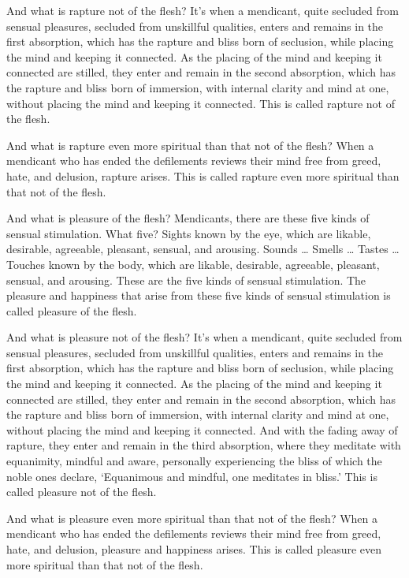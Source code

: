 \documentclass[12pt,openany]{book}%
\begin{document}
And what is rapture not of the flesh? It’s when a mendicant, quite secluded from sensual pleasures, secluded from unskillful qualities, enters and remains in the first absorption, which has the rapture and bliss born of seclusion, while placing the mind and keeping it connected. As the placing of the mind and keeping it connected are stilled, they enter and remain in the second absorption, which has the rapture and bliss born of immersion, with internal clarity and mind at one, without placing the mind and keeping it connected. This is called rapture not of the flesh. 

And what is rapture even more spiritual than that not of the flesh? When a mendicant who has ended the defilements reviews their mind free from greed, hate, and delusion, rapture arises. This is called rapture even more spiritual than that not of the flesh. 

And what is pleasure of the flesh? Mendicants, there are these five kinds of sensual stimulation. What five? Sights known by the eye, which are likable, desirable, agreeable, pleasant, sensual, and arousing. Sounds … Smells … Tastes … Touches known by the body, which are likable, desirable, agreeable, pleasant, sensual, and arousing. These are the five kinds of sensual stimulation. The pleasure and happiness that arise from these five kinds of sensual stimulation is called pleasure of the flesh. 

And what is pleasure not of the flesh? It’s when a mendicant, quite secluded from sensual pleasures, secluded from unskillful qualities, enters and remains in the first absorption, which has the rapture and bliss born of seclusion, while placing the mind and keeping it connected. As the placing of the mind and keeping it connected are stilled, they enter and remain in the second absorption, which has the rapture and bliss born of immersion, with internal clarity and mind at one, without placing the mind and keeping it connected. And with the fading away of rapture, they enter and remain in the third absorption, where they meditate with equanimity, mindful and aware, personally experiencing the bliss of which the noble ones declare, ‘Equanimous and mindful, one meditates in bliss.’ This is called pleasure not of the flesh. 

And what is pleasure even more spiritual than that not of the flesh? When a mendicant who has ended the defilements reviews their mind free from greed, hate, and delusion, pleasure and happiness arises. This is called pleasure even more spiritual than that not of the flesh. 
\end{document}
